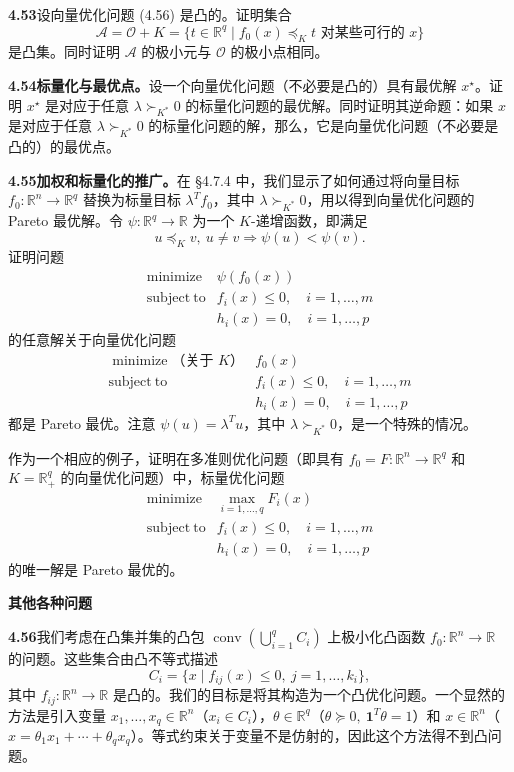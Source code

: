 \documentclass[UTF8,12pt,a4paper,fontset=fandol]{ctexart}
\begin{document}
\noindent\textbf{4.53}\quad 设向量优化问题 (4.56) 是凸的。证明集合
\[
\mathcal{A}=\mathcal{O}+K=\{t\in\mathbb{R}^q\mid f_0(x)\preceq_K t\text{ 对某些可行的 }x\}
\]
是凸集。同时证明 $\mathcal{A}$ 的极小元与 $\mathcal{O}$ 的极小点相同。

\noindent\textbf{4.54\quad 标量化与最优点。}\quad 设一个向量优化问题（不必要是凸的）具有最优解 $x^\star$。证明 $x^\star$ 是对应于任意 $\lambda\succ_{K^\ast}0$ 的标量化问题的最优解。同时证明其逆命题：如果 $x$ 是对应于任意 $\lambda\succ_{K^\ast}0$ 的标量化问题的解，那么，它是向量优化问题（不必要是凸的）的最优点。

\noindent\textbf{4.55\quad 加权和标量化的推广。}\quad 在 \S4.7.4 中，我们显示了如何通过将向量目标 $f_0:\mathbb{R}^n\to\mathbb{R}^q$ 替换为标量目标 $\lambda^Tf_0$，其中 $\lambda\succ_{K^\ast}0$，用以得到向量优化问题的 Pareto 最优解。令 $\psi:\mathbb{R}^q\to\mathbb{R}$ 为一个 $K$-递增函数，即满足
\[
u\preceq_K v,\ u\neq v\Longrightarrow \psi(u)<\psi(v).
\]
证明问题
\[
\begin{array}{ll}
\mathop{\mathrm{minimize}} & \psi(f_0(x))\\
\mathrm{subject\ to} & f_i(x)\leq0,\quad i=1,\ldots,m\\
& h_i(x)=0,\quad i=1,\ldots,p
\end{array}
\]
的任意解关于向量优化问题
\[
\begin{array}{ll}
\mathop{\mathrm{minimize}}\text{（关于 }K\text{）} & f_0(x)\\
\mathrm{subject\ to} & f_i(x)\leq0,\quad i=1,\ldots,m\\
& h_i(x)=0,\quad i=1,\ldots,p
\end{array}
\]
都是 Pareto 最优。注意 $\psi(u)=\lambda^Tu$，其中 $\lambda\succ_{K^\ast}0$，是一个特殊的情况。

作为一个相应的例子，证明在多准则优化问题（即具有 $f_0=F:\mathbb{R}^n\to\mathbb{R}^q$ 和 $K=\mathbb{R}_+^q$ 的向量优化问题）中，标量优化问题
\[
\begin{array}{ll}
\mathop{\mathrm{minimize}} & \max_{i=1,\ldots,q}F_i(x)\\
\mathrm{subject\ to} & f_i(x)\leq0,\quad i=1,\ldots,m\\
& h_i(x)=0,\quad i=1,\ldots,p
\end{array}
\]
的唯一解是 Pareto 最优的。

\noindent\textbf{其他各种问题}

\noindent\textbf{4.56\quad [P. Parrilo]}\quad 我们考虑在凸集并集的凸包 $\operatorname{conv}(\bigcup_{i=1}^q C_i)$ 上极小化凸函数 $f_0:\mathbb{R}^n\to\mathbb{R}$ 的问题。这些集合由凸不等式描述
\[
C_i=\{x\mid f_{ij}(x)\leq0,\ j=1,\ldots,k_i\},
\]
其中 $f_{ij}:\mathbb{R}^n\to\mathbb{R}$ 是凸的。我们的目标是将其构造为一个凸优化问题。一个显然的方法是引入变量 $x_1,\ldots,x_q\in\mathbb{R}^n$（$x_i\in C_i$），$\theta\in\mathbb{R}^q$（$\theta\succeq0,\ \mathbf{1}^T\theta=1$）和 $x\in\mathbb{R}^n$（$x=\theta_1x_1+\cdots+\theta_qx_q$）。等式约束关于变量不是仿射的，因此这个方法得不到凸问题。
\end{document}
